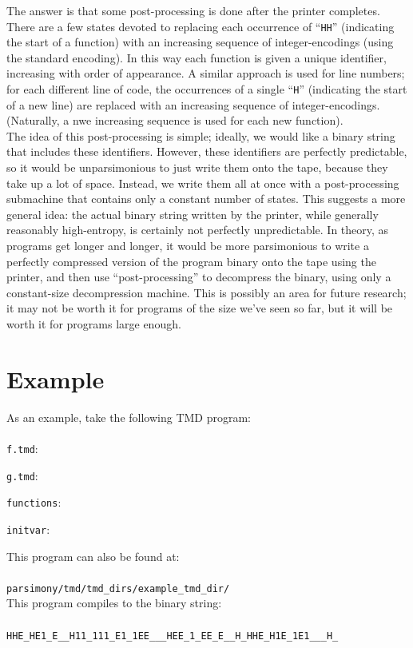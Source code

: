 \documentclass[11pt]{article}
\begin{document}
The answer is that some post-processing is done after the printer completes. There are a few states devoted to replacing each occurrence of ``\texttt{HH}'' (indicating the start of a function) with an increasing sequence of integer-encodings (using the standard encoding). In this way each function is given a unique identifier, increasing with order of appearance. A similar approach is used for line numbers; for each different line of code, the occurrences of a single ``\texttt{H}'' (indicating the start of a new line) are replaced with an increasing sequence of integer-encodings. (Naturally, a nwe increasing sequence is used for each new function). \\

The idea of this post-processing is simple; ideally, we would like a binary string that includes these identifiers. However, these identifiers are perfectly predictable, so it would be unparsimonious to just write them onto the tape, because they take up a lot of space. Instead, we write them all at once with a post-processing submachine that contains only a constant number of states. This suggests a more general idea: the actual binary string written by the printer, while generally reasonably high-entropy, is certainly not perfectly unpredictable. In theory, as programs get longer and longer, it would be more parsimonious to write a perfectly compressed version of the program binary onto the tape using the printer, and then use ``post-processing'' to decompress the binary, using only a constant-size decompression machine. This is possibly an area for future research; it may not be worth it for programs of the size we've seen so far, but it will be worth it for programs large enough.

\section{Example}

As an example, take the following TMD program: \\ \\ 
\texttt{f.tmd}:

\texttt{g.tmd}:

\texttt{functions}:

\texttt{initvar}:


This program can also be found at: \\ \\
\texttt{parsimony/tmd/tmd_dirs/example_tmd_dir/} \\

This program compiles to the binary string: \\ \\
\texttt{HHE_HE1_E__H11_111_E1_1EE___HEE_1_EE_E__H_HHE_H1E_1E1___H_} \\ 
\end{document}
